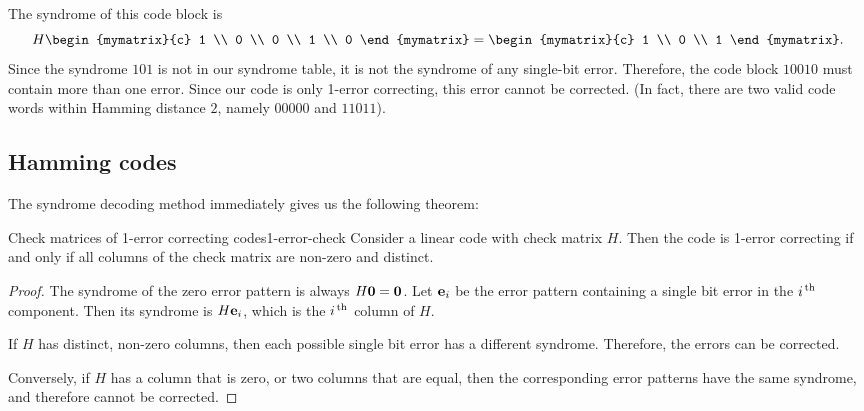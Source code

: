 \begin{solution}
  The syndrome of this code block is
  \begin{equation*}
    H \begin{mymatrix}{c} 1 \\ 0 \\ 0 \\ 1 \\ 0 \end{mymatrix}
    = \begin{mymatrix}{c} 1 \\ 0 \\ 1 \end{mymatrix}.
  \end{equation*}
  Since the syndrome $101$ is not in our syndrome table, it is not the
  syndrome of any single-bit error. Therefore, the code block $10010$
  must contain more than one error. Since our code is only 1-error
  correcting, this error cannot be corrected. (In fact, there are two
  valid code words within Hamming distance $2$, namely $00000$ and
  $11011$).
\end{solution}

\subsection*{Hamming codes}

The syndrome decoding method immediately gives us the following
theorem:

\begin{theorem}{Check matrices of 1-error correcting codes}{1-error-check}
  Consider a linear code with check matrix $H$. Then the code is
  1-error correcting if and only if all columns of the check matrix
  are non-zero and distinct. 
\end{theorem}

\begin{proof}
  The syndrome of the zero error pattern is always
  $H\vect{0}=\vect{0}$. Let $\vect{e}_i$ be the error pattern
  containing a single bit error in the $i^{\,\rm th}$ component. Then its
  syndrome is $H\vect{e}_i$, which is the $i^{\,\rm th}$ column of $H$.

  If $H$ has distinct, non-zero columns, then each possible single bit
  error has a different syndrome. Therefore, the errors can be
  corrected.

  Conversely, if $H$ has a column that is zero, or two columns that
  are equal, then the corresponding error patterns have the same
  syndrome, and therefore cannot be corrected.
\end{proof}

